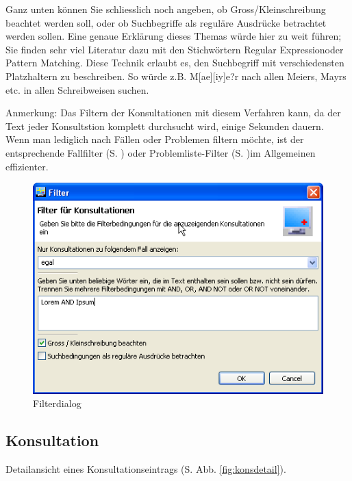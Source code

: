 Ganz unten können Sie schliesslich noch angeben, ob Gross/Kleinschreibung
beachtet werden soll, oder ob Suchbegriffe als reguläre Ausdrücke betrachtet
werden sollen. Eine genaue Erklärung dieses Themas würde hier zu weit führen;
Sie finden sehr viel Literatur dazu mit den Stichwörtern \glqq Regular
Expression\grqq{}oder \glqq Pattern Matching\grqq{}. Diese Technik erlaubt es,
den Suchbegriff mit verschiedensten Platzhaltern zu beschreiben. So würde z.B.
\glqq M[ae][iy]e?r\grqq{} nach allen Meiers, Mayrs etc. in allen Schreibweisen
suchen.

\medskip

Anmerkung:
Das Filtern der Konsultationen mit diesem Verfahren kann, da der Text jeder Konsultstion komplett durchsucht wird, einige Sekunden dauern. Wenn man lediglich nach Fällen oder Problemen filtern möchte, ist der entsprechende Fallfilter (S. \pageref{filter:fall}) oder Problemliste-Filter (S. \pageref{filter:problemliste})im Allgemeinen effizienter.

\begin{figure}[ht]
\begin{center}
  \includegraphics{images/filterdialog}
  \caption{Filterdialog}
  \label{fig:konsfilter}
\end{center}
\end{figure}


\subsection{Konsultation}
 \label{konsview}
Detailansicht eines Konsultationseintrags (S. Abb. \ref{fig:konsdetail}).


